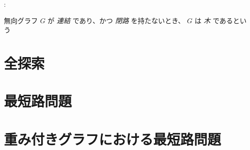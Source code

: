 \documentclass[dvipdfmx]{beamer}
\begin{document}
\begin{frame}{\insertsection: \insertsubsection}
  \begin{definition}
    無向グラフ $G$ が \emph{連結} であり、かつ \emph{閉路} を持たないとき、
    $G$ は \emph{木} であるという
  \end{definition}
\end{frame}

\section{全探索}

\section{最短路問題}

\section{重み付きグラフにおける最短路問題}
\end{document}
